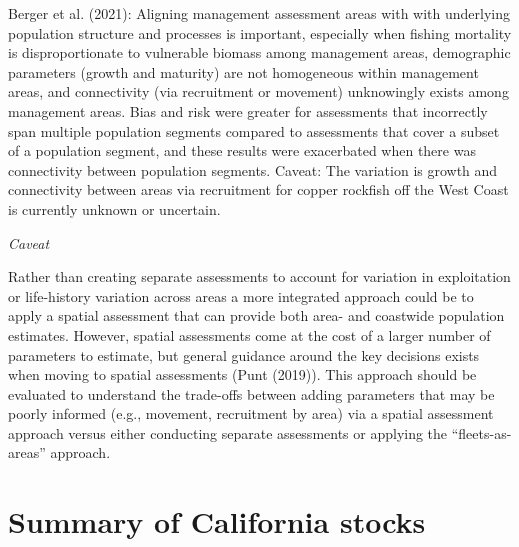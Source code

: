 \documentclass[11pt,
  english,
  a4paper,
]{article}
\begin{document}
Berger et al. {(2021)\leavevmode\tagmcend\tagstructend}: Aligning management assessment areas with with underlying population structure and processes is important, especially when fishing mortality is disproportionate to vulnerable biomass among management areas, demographic parameters (growth and maturity) are not homogeneous within management areas, and connectivity (via recruitment or movement) unknowingly exists among management areas. Bias and risk were greater for assessments that incorrectly span multiple population segments compared to assessments that cover a subset of a population segment, and these results were exacerbated when there was connectivity between population segments. Caveat: The variation is growth and connectivity between areas via recruitment for copper rockfish off the West Coast is currently unknown or uncertain.

\leavevmode\tagmcend\tagstructend\par


\emph{Caveat}

\leavevmode\tagmcend\tagstructend\par


Rather than creating separate assessments to account for variation in exploitation or life-history variation across areas a more integrated approach could be to apply a spatial assessment that can provide both area- and coastwide population estimates. However, spatial assessments come at the cost of a larger number of parameters to estimate, but general guidance around the key decisions exists when moving to spatial assessments (Punt {(2019)\leavevmode\tagmcend\tagstructend}). This approach should be evaluated to understand the trade-offs between adding parameters that may be poorly informed (e.g., movement, recruitment by area) via a spatial assessment approach versus either conducting separate assessments or applying the ``fleets-as-areas'' approach.

\leavevmode\tagmcend\tagstructend\par

\clearpage


\hypertarget{summary-of-california-stocks}{%
\section{Summary of California stocks}\label{summary-of-california-stocks}}
\end{document}
